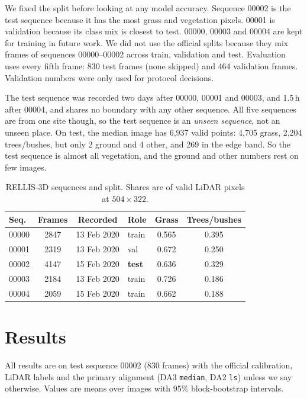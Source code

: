 \documentclass[conference]{IEEEtran}
\begin{document}
We fixed the split before looking at any model accuracy. Sequence 00002 is the test sequence because it has the most grass and vegetation pixels. 00001 is validation because its class mix is closest to test. 00000, 00003 and 00004 are kept for training in future work. We did not use the official splits because they mix frames of sequences 00000--00002 across train, validation and test. Evaluation uses every fifth frame: 830 test frames (none skipped) and 464 validation frames. Validation numbers were only used for protocol decisions.

The test sequence was recorded two days after 00000, 00001 and 00003, and 1.5\,h after 00004, and shares no boundary with any other sequence. All five sequences are from one site though, so the test sequence is an \emph{unseen sequence}, not an unseen place. On test, the median image has 6{,}937 valid points: 4{,}705 grass, 2{,}204 trees/bushes, but only 2 ground and 4 other, and 269 in the edge band. So the test sequence is almost all vegetation, and the ground and other numbers rest on few images.

\begin{table}[!t]
\caption{RELLIS-3D sequences and split. Shares are of valid LiDAR pixels at $504\times322$.}
\label{tab:split}
\centering
\small
\begin{tabular}{lcclcc}
\toprule
Seq. & Frames & Recorded & Role & Grass & Trees/bushes \\
\midrule
00000 & 2847 & 13 Feb 2020 & train & 0.565 & 0.395 \\
00001 & 2319 & 13 Feb 2020 & val   & 0.672 & 0.250 \\
00002 & 4147 & 15 Feb 2020 & \textbf{test} & 0.636 & 0.329 \\
00003 & 2184 & 13 Feb 2020 & train & 0.726 & 0.186 \\
00004 & 2059 & 15 Feb 2020 & train & 0.662 & 0.188 \\
\bottomrule
\end{tabular}
\end{table}

\section{Results}
All results are on test sequence 00002 (830 frames) with the official calibration, LiDAR labels and the primary alignment (DA3 \texttt{median}, DA2 \texttt{ls}) unless we say otherwise. Values are means over images with 95\% block-bootstrap intervals.
\end{document}
